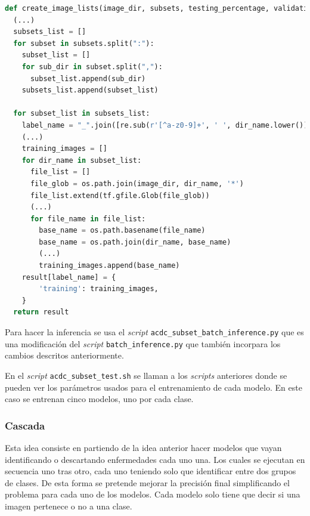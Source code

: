 \documentclass[12pt,a4paper]{article}
\begin{document}
\begin{lstlisting}[language=Python]
def create_image_lists(image_dir, subsets, testing_percentage, validation_percentage):
  (...)
  subsets_list = []
  for subset in subsets.split(":"):
    subset_list = []
    for sub_dir in subset.split(","):
      subset_list.append(sub_dir)
    subsets_list.append(subset_list)

  for subset_list in subsets_list:
    label_name = "_".join([re.sub(r'[^a-z0-9]+', ' ', dir_name.lower()) for dir_name in subset_list])
    (...)
    training_images = []
    for dir_name in subset_list:
      file_list = []
      file_glob = os.path.join(image_dir, dir_name, '*')
      file_list.extend(tf.gfile.Glob(file_glob))
      (...)
      for file_name in file_list:
        base_name = os.path.basename(file_name)
        base_name = os.path.join(dir_name, base_name)
        (...)
        training_images.append(base_name)
    result[label_name] = {
        'training': training_images,
    }
  return result
\end{lstlisting}

Para hacer la inferencia se usa el \textit{script} \texttt{acdc\_subset\_batch\_inference.py} que es una modificación del \textit{script} \texttt{batch\_inference.py} que también incorpara los cambios descritos anteriormente.

En el \textit{script} \texttt{acdc\_subset\_test.sh} se llaman a los \textit{scripts} anteriores donde se pueden ver los parámetros usados para el entrenamiento de cada modelo. En este caso se entrenan cinco modelos, uno por cada clase.

\subsubsection{Cascada}
Esta idea consiste en partiendo de la idea anterior hacer modelos que vayan identificando o descartando enfermedades cada uno una. Los cuales se ejecutan en secuencia uno tras otro, cada uno teniendo solo que identificar entre dos grupos de clases. De esta forma se pretende mejorar la precisión final simplificando el problema para cada uno de los modelos. Cada modelo solo tiene que decir si una imagen pertenece o no a una clase.
\end{document}
